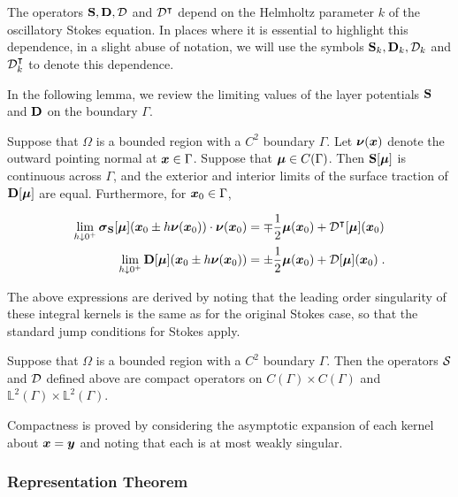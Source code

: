 \begin{remark}
The operators ${\bf S},{\bf D},{\mathcal D}$ and ${\mathcal D}^{\intercal}$
depend on the Helmholtz parameter $k$ of the oscillatory Stokes equation.
In places where it is essential to highlight this dependence, in a slight
abuse of notation, we will use the symbols ${\bf S}_{k}, {\bf D}_{k},{\mathcal D}_{k}$ and ${\mathcal D}^{\intercal}_{k}$ to 
denote this dependence.
\end{remark}

In the following lemma, we review the limiting values of
the layer potentials ${\bf S}$ and ${\bf D}$ on the boundary $\Gamma$.

\begin{lem} \label{lem:jump-conds}
  Suppose that $\Omega$ is a bounded region with a $C^{2}$ boundary
  $\Gamma$.
  Let ${\boldsymbol \nu}({\boldsymbol x})$ denote the outward pointing normal at ${\boldsymbol x} \in \Gamma$.
  Suppose that ${\boldsymbol \mu} \in C(\Gamma)$.
  Then ${\bf S}[{\boldsymbol \mu}]$
  is continuous across $\Gamma$, and the exterior and interior
  limits of the surface traction of ${\bf D}[{\boldsymbol \mu}]$ are equal.
  Furthermore, for ${\boldsymbol x}_{0} \in \Gamma$,

  \begin{align}
    \lim_{h \downarrow 0^{+}} {\boldsymbol \sigma}_{\bf S}[{\boldsymbol \mu}]({\boldsymbol x}_0 \pm h{\boldsymbol \nu}({\boldsymbol x}_0)) \cdot {\boldsymbol \nu}({\boldsymbol x}_0)
    &= \mp \frac{1}{2} {\boldsymbol \mu}({\boldsymbol x}_0) + {\mathcal D}^{\intercal}[{\boldsymbol \mu}]({\boldsymbol x}_0) \\
    \lim_{h \downarrow 0^{+}} {\bf D}[{\boldsymbol \mu}]({\boldsymbol x}_0 \pm h{\boldsymbol \nu}({\boldsymbol x}_0)) 
    &= \pm \frac{1}{2} {\boldsymbol \mu}({\boldsymbol x}_0) + {\mathcal D}[{\boldsymbol \mu}]({\boldsymbol x}_0)    \; .
  \end{align}
\end{lem}

The above expressions are derived by noting that the
leading order singularity of these integral kernels
is the same as for the original Stokes case, so that
the standard jump conditions for Stokes
\cite{KimSangtae1991,Pozrikidis1992}
apply. 

\begin{lem} \label{lem:compact-sd}
  Suppose that $\Omega$ is a bounded region with a $C^{2}$ boundary
  $\Gamma$. Then the operators ${\mathcal S}$ and ${\mathcal D}$ defined
  above are compact operators on $C(\Gamma)\times C(\Gamma)$
  and $\mathbb{L}^2(\Gamma)\times \mathbb{L}^2(\Gamma)$.
\end{lem}

Compactness is proved by considering the
asymptotic expansion of each kernel about
${\boldsymbol x}={\boldsymbol y}$ and noting that each is at most
weakly singular.

\subsubsection{Representation Theorem}

